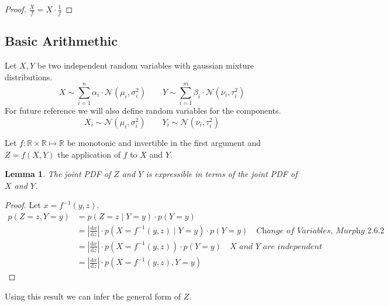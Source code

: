 \documentclass[11pt]{article}
\newtheorem{lemma}{Lemma}
\begin{document}
\begin{proof}
  $\frac{X}{f} = X \cdot \frac{1}{f}$
\end{proof}

\subsection{Basic Arithmethic}

Let $X, Y$ be two independent random variables with gaussian mixture
distributions.
\begin{equation*}
  X \sim \sum_{i = 1}^{n} \alpha_{i} \cdot \mathcal{N}(\mu_{i}, \sigma_{i}^{2}) \qquad Y \sim \sum_{i = 1}^{m} \beta_{i} \cdot \mathcal{N}(\nu_{i}, \tau_{i}^{2})
\end{equation*}
For future reference we will also define random variables for the components.
\begin{equation*}
  X_{i} \sim \mathcal{N}(\mu_{i}, \sigma_{i}^{2}) \qquad Y_{i} \sim \mathcal{N}(\nu_{i}, \tau_{i}^{2})
\end{equation*}

Let $f : \mathbb{R} \times \mathbb{R} \mapsto \mathbb{R}$ be monotonic and
invertible in the first argument and $Z = f(X, Y)$ the application of $f$ to $X$
and $Y$.

\begin{lemma}
  The joint PDF of $Z$ and $Y$ is expressible in terms of the joint PDF of $X$
  and $Y$.
\end{lemma}
\begin{proof}
  Let $x = f^{-1}(y, z)$.
  \begin{align*}
    p(Z = z, Y = y) & = p(Z = z \mid Y = y) \cdot p(Y = y)\\
                    & = \left| \frac{\mathrm{d}x}{\mathrm{d}z} \right| \cdot p(X = f^{-1}(y, z) \mid Y = y) \cdot p(Y = y) \quad\textit{Change of Variables, Murphy 2.6.2}\\
                    & = \left| \frac{\mathrm{d}x}{\mathrm{d}z} \right| \cdot p(X = f^{-1}(y, z)) \cdot p(Y = y) \quad\textit{$X$ and $Y$ are independent}\\
                    & = \left| \frac{\mathrm{d}x}{\mathrm{d}z} \right| \cdot p(X = f^{-1}(y, z), Y = y)
  \end{align*}
\end{proof}

Using this result we can infer the general form of $Z$.
\end{document}
